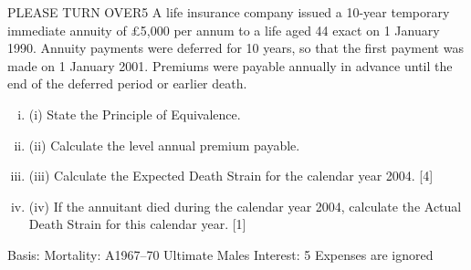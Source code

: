 \documentclass[a4paper,12pt]{article}
\begin{document}
\begin{enumerate}

PLEASE TURN OVER5
A life insurance company issued a 10-year temporary immediate annuity of £5,000
per annum to a life aged 44 exact on 1 January 1990. Annuity payments were
deferred for 10 years, so that the first payment was made on 1 January 2001.
Premiums were payable annually in advance until the end of the deferred period or
earlier death.
\begin{enumerate}[(i)]
\item (i) State the Principle of Equivalence.
\item (ii) Calculate the level annual premium payable.
\item (iii) Calculate the Expected Death Strain for the calendar year 2004.
[4]
\item 
(iv) If the annuitant died during the calendar year 2004, calculate the Actual Death
Strain for this calendar year.
[1]

\end{enumerate}

Basis: Mortality: A1967–70 Ultimate Males
Interest: 5%
Expenses are ignored




\end{enumerate}
\end{document}
